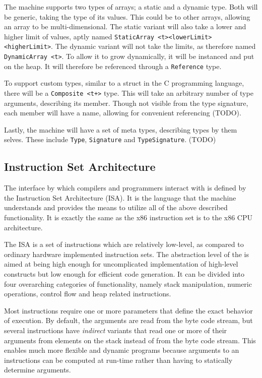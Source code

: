 
The machine supports two types of arrays; a static and a dynamic type. Both will
be generic, taking the type of its values. This could be to other arrays,
allowing an array to be multi-dimensional. The static variant will also take a
lower and higher limit of values, aptly named {\tt StaticArray
  <t><lowerLimit><higherLimit>}. The dynamic variant will not take the limits,
as therefore named {\tt DynamicArray <t>}. To allow it to grow dynamically, it
will be instanced and put on the heap. It will therefore be referenced through a
{\tt Reference} type.


To support custom types, similar to a struct in the C programming language,
there will be a {\tt Composite <t+>} type. This will take an arbitrary number of
type arguments, describing its member. Though not visible from the type
signature, each member will have a name, allowing for convenient referencing (TODO).

Lastly, the machine will have a set of meta types, describing types by them
selves. These include {\tt Type}, {\tt Signature} and {\tt TypeSignature}. (TODO)

\subsection{Instruction Set Architecture}
\label{sec:design:isa}

The interface by which compilers and programmers interact with \thename{} is
defined by the Instruction Set Architecture (ISA). It is the language that the
machine understands and provides the means to utilize all of the above described
functionality. It is exactly the same as the x86 instruction set is to the x86
CPU architecture.

The \thename{} ISA is a set of instructions which are relatively low-level, as
compared to ordinary hardware implemented instruction sets. The abstraction
level of the \thename{} is aimed at being high enough for uncomplicated
implementation of high-level constructs but low enough for efficient code
generation. It can be divided into four overarching categories of functionality,
namely stack manipulation, numeric operations, control flow and heap related
instructions.

Most instructions require one or more parameters that define the exact behavior
of execution. By default, the arguments are read from the byte code stream, but
several instructions have \emph{indirect} variants that read one or more of
their arguments from elements on the stack instead of from the byte code
stream. This enables much more flexible and dynamic programs because arguments
to an instructions can be computed at run-time rather than having to statically
determine arguments.

